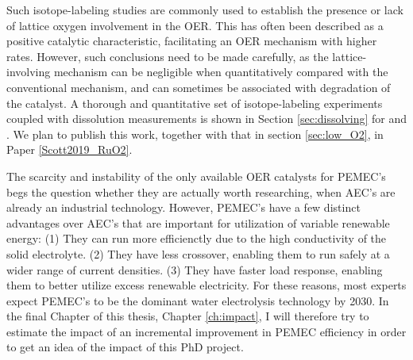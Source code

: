 Such isotope-labeling studies are commonly used to establish the presence or lack of lattice oxygen involvement in the OER. This has often been described as a positive catalytic characteristic, facilitating an OER mechanism with higher rates\cite{Grimaud2017, Geiger2018}. However, such conclusions need to be made carefully, as the lattice-involving mechanism can be negligible when quantitatively compared with the conventional mechanism, and can sometimes be associated with degradation of the catalyst. A thorough and quantitative set of isotope-labeling experiments coupled with dissolution measurements is shown in Section \ref{sec:dissolving} for  and . We plan to publish this work, together with that in section \ref{sec:low_O2}, in Paper \ref{Scott2019_RuO2}.

The scarcity and instability of the only available OER catalysts for PEMEC's begs the question whether they are actually worth researching, when AEC's are already an industrial technology. However, PEMEC's have a few distinct advantages over AEC's that are important for utilization of variable renewable energy\cite{Carmo2013}: (1) They can run more efficienctly due to the high conductivity of the solid electrolyte. (2) They have less  crossover, enabling them to run safely at a wider range of current densities. (3) They have faster load response, enabling them to better utilize excess renewable electricity. For these reasons, most experts expect PEMEC's to be the dominant water electrolysis technology by 2030\cite{Schmidt2017}. In the final Chapter of this thesis, Chapter \ref{ch:impact}, I will therefore try to estimate the impact of an incremental improvement in PEMEC efficiency in order to get an idea of the impact of this PhD project.
